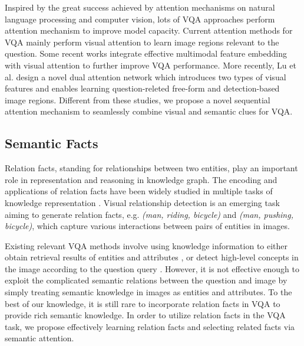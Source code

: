 \documentclass[sigconf]{acmart}
\begin{document}
Inspired by the great success achieved by attention mechanisms on natural language processing and computer vision, 
lots of VQA approaches perform attention mechanism to improve model capacity.
Current attention methods \cite{xu2016ask,yang2016stacked} for VQA mainly perform visual attention
to learn image regions relevant to the question. Some recent works \cite{kim2016multimodal,fukui2016multimodal,kim2016hadamard,gao2018question}
integrate effective multimodal feature embedding with visual attention to further improve VQA performance. 
More recently, 	Lu et al. \cite{lu2018co-attending} design a novel dual attention network which introduces two types of visual features and enables learning question-releted free-form and detection-based image regions.
Different from these studies, we propose a novel sequential attention mechanism
to seamlessly combine visual and semantic clues for VQA.



\subsection{Semantic Facts}
Relation facts, standing for relationships between two entities, play an important role in representation and reasoning in knowledge graph. The encoding and applications of relation facts have been widely studied in multiple tasks of knowledge representation  \cite{socher2013reasoning,bordes2013translating}. Visual relationship detection is an emerging task aiming to generate relation facts\cite{lu2016visual, li2017vip}, e.g. \textit{(man, riding, bicycle)} and \textit{(man, pushing, bicycle)}, which capture various interactions between pairs of entities in images.

Existing relevant VQA methods involve using knowledge information to either obtain retrieval results of entities and
attributes \cite{wu2016ask,li2017incorporating,wu2017image}, or detect high-level concepts in the image according to the question query \cite{wu2016value}.
However, it is not effective enough to exploit the complicated semantic relations between the question and image
by simply treating semantic knowledge in images as entities and attributes.
To the best of our knowledge, it is still rare to incorporate relation facts in VQA to provide rich semantic knowledge.
In order to utilize relation facts in the VQA task, we propose effectively
learning relation facts and selecting related facts via semantic attention.
\end{document}
